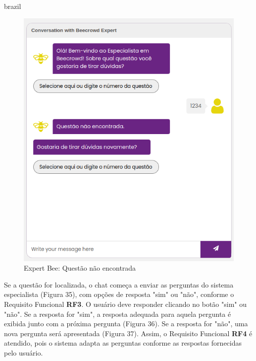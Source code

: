 \begin{otherlanguage*}{brazil}
\begin{figure}[H]
    \centering
            \caption{Expert Bee: Questão não encontrada}
            \label{fig:ModeloConceitual}
        \includegraphics[scale=0.63]{pictures/desenvolvimento/expert_bee_questao_nao_encontrada.png}
\end{figure}

Se a questão for localizada, o chat começa a enviar as perguntas do sistema especialista (Figura 35), com opções de resposta "sim" ou "não", conforme o Requisito Funcional \textbf{RF3}. O usuário deve responder clicando no botão "sim" ou "não". Se a resposta for "sim", a resposta adequada para aquela pergunta é exibida junto com a próxima pergunta (Figura 36). Se a resposta for "não", uma nova pergunta será apresentada (Figura 37). Assim, o Requisito Funcional \textbf{RF4} é atendido, pois o sistema adapta as perguntas conforme as respostas fornecidas pelo usuário.


\end{otherlanguage*}
